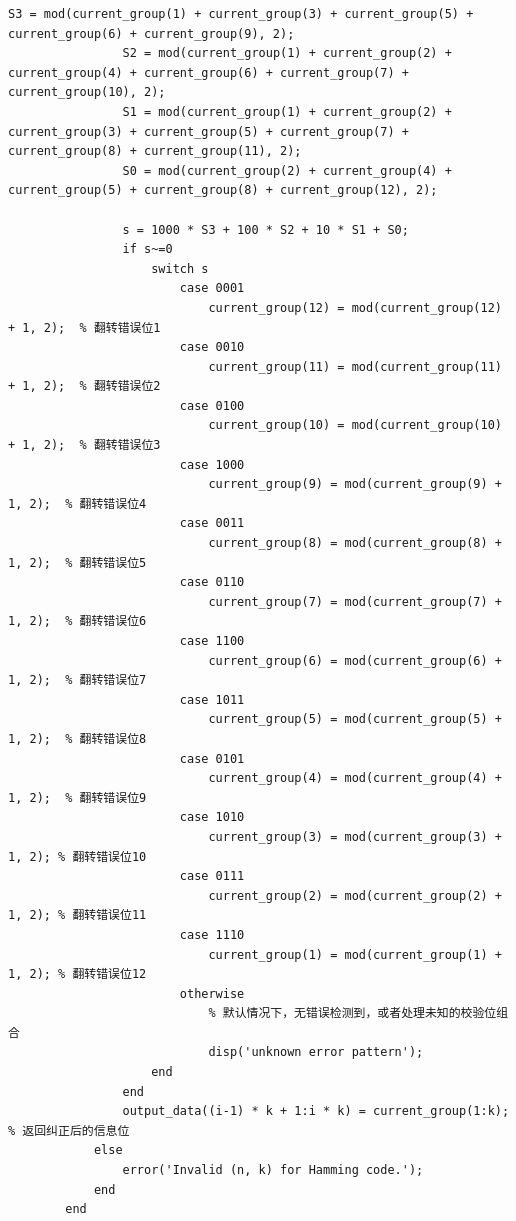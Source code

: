 \documentclass[UTF8]{ctexart}
\begin{document}
\begin{lstlisting}[title=ASK\_DeChannelcode.m(汉明码部分), frame=shadowbox]
                S3 = mod(current_group(1) + current_group(3) + current_group(5) + current_group(6) + current_group(9), 2);
                S2 = mod(current_group(1) + current_group(2) + current_group(4) + current_group(6) + current_group(7) + current_group(10), 2);
                S1 = mod(current_group(1) + current_group(2) + current_group(3) + current_group(5) + current_group(7) + current_group(8) + current_group(11), 2);
                S0 = mod(current_group(2) + current_group(4) + current_group(5) + current_group(8) + current_group(12), 2);
                
                s = 1000 * S3 + 100 * S2 + 10 * S1 + S0;
                if s~=0
                    switch s
                        case 0001
                            current_group(12) = mod(current_group(12) + 1, 2);  % 翻转错误位1
                        case 0010
                            current_group(11) = mod(current_group(11) + 1, 2);  % 翻转错误位2
                        case 0100
                            current_group(10) = mod(current_group(10) + 1, 2);  % 翻转错误位3
                        case 1000
                            current_group(9) = mod(current_group(9) + 1, 2);  % 翻转错误位4
                        case 0011
                            current_group(8) = mod(current_group(8) + 1, 2);  % 翻转错误位5
                        case 0110
                            current_group(7) = mod(current_group(7) + 1, 2);  % 翻转错误位6
                        case 1100
                            current_group(6) = mod(current_group(6) + 1, 2);  % 翻转错误位7
                        case 1011
                            current_group(5) = mod(current_group(5) + 1, 2);  % 翻转错误位8
                        case 0101
                            current_group(4) = mod(current_group(4) + 1, 2);  % 翻转错误位9
                        case 1010
                            current_group(3) = mod(current_group(3) + 1, 2); % 翻转错误位10
                        case 0111
                            current_group(2) = mod(current_group(2) + 1, 2); % 翻转错误位11
                        case 1110
                            current_group(1) = mod(current_group(1) + 1, 2); % 翻转错误位12
                        otherwise
                            % 默认情况下，无错误检测到，或者处理未知的校验位组合
                            disp('unknown error pattern');
                    end
                end
                output_data((i-1) * k + 1:i * k) = current_group(1:k);  % 返回纠正后的信息位
            else
                error('Invalid (n, k) for Hamming code.');
            end
        end
\end{lstlisting}
\end{document}

